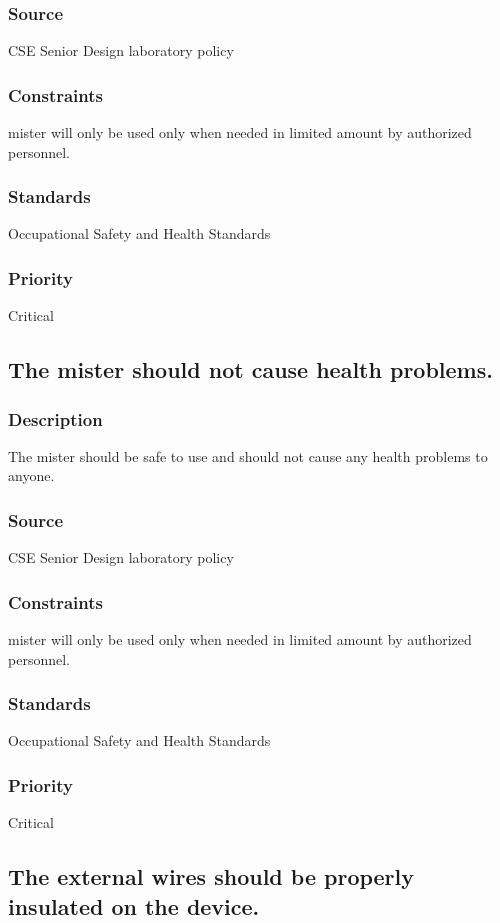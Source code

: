\subsubsection{Source}
CSE Senior Design laboratory policy
\subsubsection{Constraints}
mister will only be used only when needed in limited amount by authorized personnel.
\subsubsection{Standards}
Occupational Safety and Health Standards
\subsubsection{Priority}
Critical

\subsection{The mister should not cause health problems.}
\subsubsection{Description}
The mister should be safe to use and should not cause any health problems to anyone.
\subsubsection{Source}
CSE Senior Design laboratory policy
\subsubsection{Constraints}
mister will only be used only when needed in limited amount by authorized personnel.
\subsubsection{Standards}
Occupational Safety and Health Standards
\subsubsection{Priority}
Critical

\subsection{The external wires should be properly insulated on the device.}
